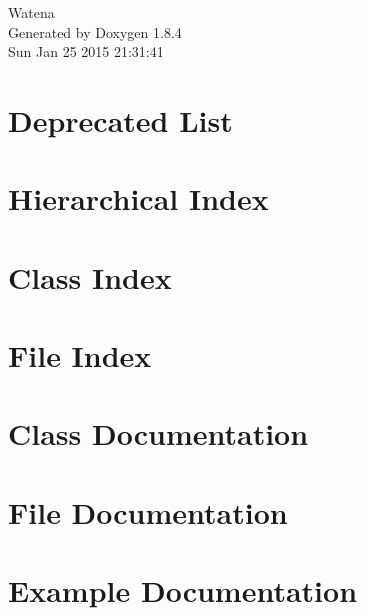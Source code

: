 \documentclass[twoside]{book}
\newcommand{\clearemptydoublepage}{%
  \newpage{\pagestyle{empty}\cleardoublepage}%
}
\begin{document}
\hypersetup{pageanchor=false}
\begin{titlepage}
\vspace*{7cm}
\begin{center}%
{\Large Watena }\\
\vspace*{1cm}
{\large Generated by Doxygen 1.8.4}\\
\vspace*{0.5cm}
{\small Sun Jan 25 2015 21:31:41}\\
\end{center}
\end{titlepage}
\clearemptydoublepage
\tableofcontents
\clearemptydoublepage
{}
\hypersetup{pageanchor=true}

\chapter{Deprecated List}
\label{deprecated}
\hypertarget{deprecated}{}

\chapter{Hierarchical Index}

\chapter{Class Index}

\chapter{File Index}

\chapter{Class Documentation}




































\chapter{File Documentation}

\chapter{Example Documentation}


\newpage
{}
{}
\printindex
\end{document}
